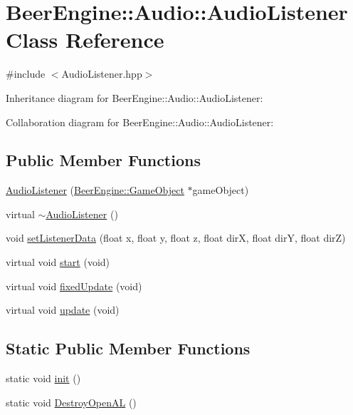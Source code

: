 \hypertarget{class_beer_engine_1_1_audio_1_1_audio_listener}{}\section{Beer\+Engine\+:\+:Audio\+:\+:Audio\+Listener Class Reference}
\label{class_beer_engine_1_1_audio_1_1_audio_listener}


{\ttfamily \#include $<$Audio\+Listener.\+hpp$>$}



Inheritance diagram for Beer\+Engine\+:\+:Audio\+:\+:Audio\+Listener\+:


Collaboration diagram for Beer\+Engine\+:\+:Audio\+:\+:Audio\+Listener\+:
\subsection*{Public Member Functions}
\begin{DoxyCompactItemize}
\item 
\mbox{\hyperlink{class_beer_engine_1_1_audio_1_1_audio_listener_a7f652b4e6cd4df8038630081fa475d62}{Audio\+Listener}} (\mbox{\hyperlink{class_beer_engine_1_1_game_object}{Beer\+Engine\+::\+Game\+Object}} $\ast$game\+Object)
\item 
virtual \mbox{\hyperlink{class_beer_engine_1_1_audio_1_1_audio_listener_a7fb8733754e4c09b5a32792b3beb78b1}{$\sim$\+Audio\+Listener}} ()
\item 
void \mbox{\hyperlink{class_beer_engine_1_1_audio_1_1_audio_listener_a8d22256683171dcdc258a5e3f707701c}{set\+Listener\+Data}} (float x, float y, float z, float dirX, float dirY, float dirZ)
\item 
virtual void \mbox{\hyperlink{class_beer_engine_1_1_audio_1_1_audio_listener_a1d4d5e21f30edb7dba64e87f0712c3b3}{start}} (void)
\item 
virtual void \mbox{\hyperlink{class_beer_engine_1_1_audio_1_1_audio_listener_ad3d6b34a33582c17e2c7bc250e4e6937}{fixed\+Update}} (void)
\item 
virtual void \mbox{\hyperlink{class_beer_engine_1_1_audio_1_1_audio_listener_a32c348d619ff2ca57d16af803d7dfcfd}{update}} (void)
\end{DoxyCompactItemize}
\subsection*{Static Public Member Functions}
\begin{DoxyCompactItemize}
\item 
static void \mbox{\hyperlink{class_beer_engine_1_1_audio_1_1_audio_listener_ab5d881529114f89d6d01a043f84fc14e}{init}} ()
\item 
static void \mbox{\hyperlink{class_beer_engine_1_1_audio_1_1_audio_listener_acff5f055ac723e3842beb7bc9c7483c6}{Destroy\+Open\+AL}} ()
\end{DoxyCompactItemize}
